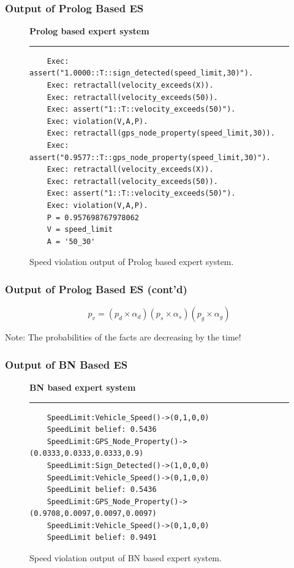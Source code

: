 \documentclass{beamer}
\newenvironment{mylisting}
{\begin{list}{}{\setlength{\leftmargin}{1em}}\item\scriptsize\bfseries}
{\end{list}}
\begin{document}
\begin{frame} [fragile]
	\frametitle{Output of Prolog Based ES } 
	\begin{figure}
	\begin{mylisting}
	Prolog based expert system
	\vspace*{2px}\hrule
	\begin{verbatim}
	Exec: assert("1.0000::T::sign_detected(speed_limit,30)").
	Exec: retractall(velocity_exceeds(X)).
	Exec: retractall(velocity_exceeds(50)).
	Exec: assert("1::T::velocity_exceeds(50)").
	Exec: violation(V,A,P).
	Exec: retractall(gps_node_property(speed_limit,30)).
	Exec: assert("0.9577::T::gps_node_property(speed_limit,30)").
	Exec: retractall(velocity_exceeds(X)).
	Exec: retractall(velocity_exceeds(50)).
	Exec: assert("1::T::velocity_exceeds(50)").
	Exec: violation(V,A,P).
	P = 0.957698767978062
	V = speed_limit
	A = '50_30'
	\end{verbatim}
	\end{mylisting}
	      \caption{Speed violation output of Prolog based expert system.}
	      \label{output1}
	\end{figure}	
\end{frame}

\begin{frame}
	\frametitle{Output of Prolog Based ES (cont'd)} 
	\begin{equation}
	\label{eq13}
		p_{v} = (p_{d} \times \alpha_{d} )(p_{s} \times \alpha_{s} )(p_{g} \times \alpha_{g})
	\end{equation}
	\begin{block}{}	
	Note: The probabilities of the facts are decreasing by the time!
	\end{block}
\end{frame}

\begin{frame} [fragile]
	\frametitle{Output of BN Based ES } 
	\begin{figure}
	\begin{mylisting}
	BN based expert system
	\vspace*{2px}\hrule
	\begin{verbatim}
	SpeedLimit:Vehicle_Speed()->(0,1,0,0)
	SpeedLimit belief: 0.5436
	SpeedLimit:GPS_Node_Property()->(0.0333,0.0333,0.0333,0.9)
	SpeedLimit:Sign_Detected()->(1,0,0,0)
	SpeedLimit:Vehicle_Speed()->(0,1,0,0)
	SpeedLimit belief: 0.5436
	SpeedLimit:GPS_Node_Property()->(0.9708,0.0097,0.0097,0.0097)
	SpeedLimit:Vehicle_Speed()->(0,1,0,0)
	SpeedLimit belief: 0.9491
	\end{verbatim}
	\end{mylisting}
	      \caption{Speed violation output of BN based expert system.}
	      \label{output2}
	\end{figure}
\end{frame}
\end{document}

